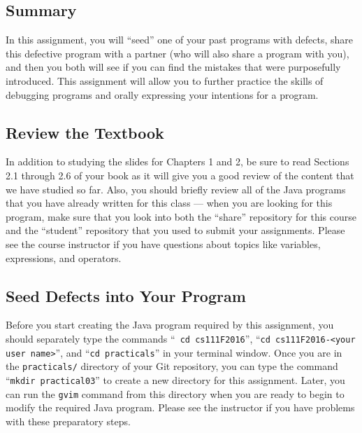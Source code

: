 


\vspace*{-.3in}
\subsection*{Summary}

In this assignment, you will ``seed'' one of your past programs with defects, share this defective program with a
partner (who will also share a program with you), and then you both will see if you can find the mistakes that were
purposefully introduced. This assignment will allow you to further practice the skills of debugging programs and orally
expressing your intentions for a program.

\vspace*{-.15in}
\subsection*{Review the Textbook}
\vspace*{-.075in}

In addition to studying the slides for Chapters 1 and 2, be sure to read Sections 2.1 through 2.6 of your book as it
will give you a good review of the content that we have studied so far. Also, you should briefly review all of the Java
programs that you have already written for this class --- when you are looking for this program, make sure that you look
into both the ``share'' repository for this course and the ``student'' repository that you used to submit your
assignments. Please see the course instructor if you have questions about topics like variables, expressions, and
operators.

\vspace*{-.15in}
\subsection*{Seed Defects into Your Program}
\vspace*{-.075in}

Before you start creating the Java program required by this assignment, you should separately type the commands ``{\tt
cd cs111F2016}'', ``{\tt cd cs111F2016-<your user name>}'', and ``{\tt cd practicals}'' in your terminal window. Once
you are in the {\tt practicals/} directory of your Git repository, you can type the command ``{\tt mkdir practical03}''
to create a new directory for this assignment. Later, you can run the {\tt gvim} command from this directory when you
are ready to begin to modify the required Java program. Please see the instructor if you have problems with these
preparatory steps.

